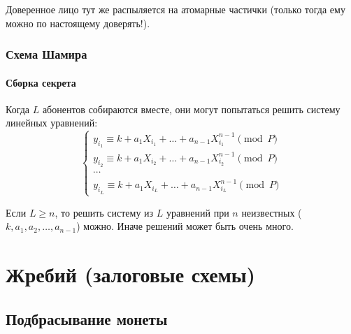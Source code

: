 Доверенное лицо тут же распыляется на атомарные частички (только тогда ему можно по настоящему доверять!).

\begin{frame}
    \frametitle{Схема Шамира}
    \framesubtitle{Сборка секрета}

    Когда $L$ абонентов собираются вместе, они могут попытаться решить систему линейных уравнений:
    \[
        \begin{cases}
            y_{i_1}\equiv k+a_1X_{i_1}+\ldots+a_{n-1}X_{i_1}^{n-1}\pmod{P}\\
            y_{i_2}\equiv k+a_1X_{i_2}+\ldots+a_{n-1}X_{i_2}^{n-1}\pmod{P}\\
            \cdots\\
            y_{i_L}\equiv k+a_1X_{i_L}+\ldots+a_{n-1}X_{i_L}^{n-1}\pmod{P}
        \end{cases}
    \]

    Если $L\geq n$, то решить систему из $L$ уравнений при $n$ неизвестных ($k,a_1,a_2,\ldots,a_{n-1}$) можно. Иначе решений может быть очень много.
\end{frame}


\section{Жребий (залоговые схемы)}

\subsection{Подбрасывание монеты}

